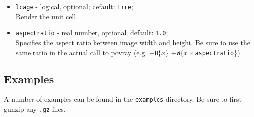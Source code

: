 \documentclass[
  notitlepage,
  twoside,
   prb,
  floatfix,
]{revtex4-1}
\begin{document}
\begin{itemize}
\item
{\tt lcage} - logical, optional; default: {\tt true};\\
Render the unit cell.

\item
{\tt aspectratio} - real number, optional; default: {\tt 1.0}; \\
Specifies the aspect ratio between image width and height. Be sure to use the same ratio in the actual call to \textsf{povray} (e.g. $+${\tt H}$\{x\}$ $+${\tt W}$\{x\times${\tt aspectratio}$\}$)

\end{itemize}

\subsection*{Examples}
A number of examples can be found in the {\tt examples} directory. Be sure to first \textsf{gunzip} any {\tt *.gz} files.
\end{document}
